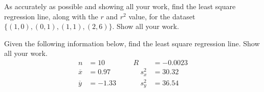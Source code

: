 \documentclass[11pt,letterpaper]{article}
\begin{document}

 As accurately as possible and showing all your work, find the least square regression line, along with the $r$ and $r^2$ value, for the dataset $\{ (1, 0), (0, 1), (1, 1), (2, 6) \}$. Show all your work. 



\newpage



 Given the following information below, find the least square regression line. Show all your work. 
	\[
	\begin{aligned}
	n&= 10 &&& R&= -0.0023 \\
	\overline{x}&= 0.97 &&& \quad s_x^2&= 30.32 \\
	\overline{y}&= -1.33 &&& \quad s_y^2&= 36.54
	\end{aligned}
	\]



\newpage
\end{document}
